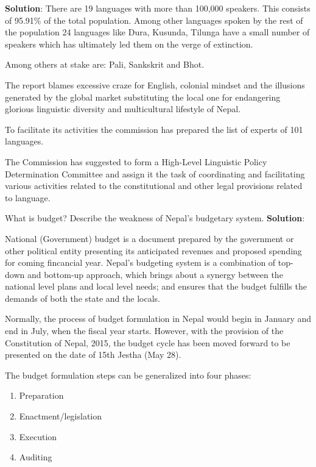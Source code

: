 \documentclass[
]{book}
\newcommand{\question}{\item}
\newenvironment{solution}{ {\bfseries Solution}:}{}
\begin{document}
\begin{questions}
\begin{solution}
There are 19 languages with more than 100,000 speakers. This consists of 95.91\% of the total population. Among other languages spoken by the rest of the population 24 languages like Dura, Kusunda, Tilunga have a small number of speakers which has ultimately led them on the verge of extinction.

Among others at stake are: Pali, Sankskrit and Bhot.

The report blames excessive craze for English, colonial mindset and the illusions generated by the global market substituting the local one for endangering glorious linguistic diversity and multicultural lifestyle of Nepal.

To facilitate its activities the commission has prepared the list of experts of 101 languages.

The Commission has suggested to form a High-Level Linguistic Policy Determination Committee and assign it the task of coordinating and facilitating various activities related to the constitutional and other legal provisions related to language.

\end{solution}

\question What is budget? Describe the weakness of Nepal's budgetary system.
\begin{solution}

National (Government) budget is a document prepared by the government or other political entity presenting its anticipated revenues and proposed spending for coming fincancial year. Nepal's budgeting system is a combination of top-down and bottom-up approach, which brings about a synergy between the national level plans and local level needs; and ensures that the budget fulfills the demands of both the state and the locals.

Normally, the process of budget formulation in Nepal would begin in January and end in July, when the fiscal year starts. However, with the provision of the Constitution of Nepal, 2015, the budget cycle has been moved forward to be presented on the date of 15th Jestha (May 28).

The budget formulation steps can be generalized into four phases:
\begin{enumerate}
\item Preparation
\item Enactment/legislation
\item Execution
\item Auditing
\end{enumerate}


\end{solution}
\end{questions}
\end{document}
